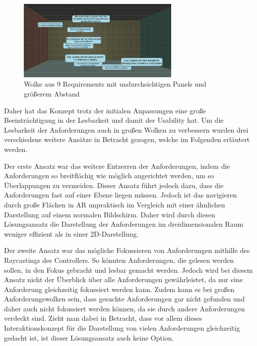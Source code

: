 \begin{figure}[H]
    \centering
    \includegraphics[width=0.7\textwidth]{images/WolkenPrototyp3.png}
    \caption{Wolke aus 9 Requirements mit undurchsichtigen Panels und größerem Abstand}
    \label{fig:wolken-prototyp-3}
\end{figure}

Daher hat das Konzept trotz der initialen Anpassungen eine große Beeinträchtigung in der Lesbarkeit und damit der Usability hat.
Um die Lesbarkeit der Anforderungen auch in großen Wolken zu verbessern wurden drei verschiedene weitere Ansätze in Betracht gezogen, welche im Folgenden erläutert werden.

Der erste Ansatz war das weitere Entzerren der Anforderungen, indem die Anforderungen so breitflächig wie möglich angerichtet werden, um so Überlappungen zu vermeiden.
Dieser Ansatz führt jedoch dazu, dass die Anforderungen fast auf einer Ebene liegen müssen.
Jedoch ist das navigieren durch große Flächen in AR unpraktisch im Vergleich mit einer ähnlichen Darstellung auf einem normalen Bildschirm.
Daher wird durch diesen Lösungsansatz die Darstellung der Anforderungen im dreidimensionalen Raum weniger effizient als in einer 2D-Darstellung.

Der zweite Ansatz war das mögliche Fokussieren von Anforderungen mithilfe des Raycastings des Controllers.
So könnten Anforderungen, die gelesen werden sollen, in den Fokus gebracht und lesbar gemacht werden.
Jedoch wird bei diesem Ansatz nicht der Überblick über alle Anforderungen gewährleistet, da nur eine Anforderung gleichzeitig fokussiert werden kann.
Zudem kann es bei großen Anforderungswolken sein, dass gesuchte Anforderungen gar nicht gefunden und daher auch nicht fokussiert werden können, da sie durch andere Anforderungen verdeckt sind.
Zieht man dabei in Betracht, dass vor allem dieses Interaktionskonzept für die Darstellung von vielen Anforderungen gleichzeitig gedacht ist, ist dieser Lösungsansatz auch keine Option.

